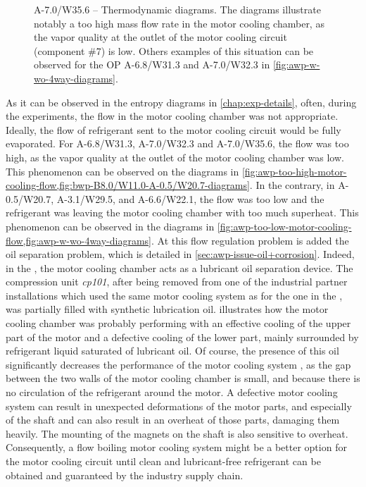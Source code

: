 \begin{figure}[htbp]
  \centering
  \hspace{1em}
  \caption[A-7.0/W35.6 -- Thermodynamic diagrams]{A-7.0/W35.6 --
    Thermodynamic diagrams. The diagrams illustrate notably a too high
    mass flow rate in the motor cooling chamber, as the vapor quality
    at the outlet of the motor cooling circuit (component \#7) is
    low. Others examples of this situation can be observed for the OP
    A-6.8/W31.3 and A-7.0/W32.3 in \cref{fig:awp-w-wo-4way-diagrams}.}
  \label{fig:awp-too-low-motor-cooling-flow}
\end{figure}

As it can be observed in the entropy diagrams in
\cref{chap:exp-details}, often, during the experiments, the flow in
the motor cooling chamber was not appropriate. Ideally, the flow of
refrigerant sent to the motor cooling circuit would be fully
evaporated. For \OP{} A-6.8/W31.3, A-7.0/W32.3 and A-7.0/W35.6, the
flow was too high, as the vapor quality at the outlet of the motor
cooling chamber was low. This phenomenon can be observed on the
diagrams in
\cref{fig:awp-too-high-motor-cooling-flow,fig:bwp-B8.0/W11.0-A-0.5/W20.7-diagrams}. In
the contrary, in \OP{} A-0.5/W20.7, A-3.1/W29.5, and A-6.6/W22.1, the
flow was too low and the refrigerant was leaving the motor cooling
chamber with too much superheat. This phenomenon can be observed in
the diagrams in
\cref{fig:awp-too-low-motor-cooling-flow,fig:awp-w-wo-4way-diagrams}. At
this flow regulation problem is added the oil separation problem,
which is detailed in \cref{sec:awp-issue-oil+corrosion}. Indeed, in
the \AWP{}, the motor cooling chamber acts as a lubricant oil
separation device. The compression unit \textit{cp101}, after being
removed from one of the industrial partner installations which used
the same motor cooling system as for the one in the \AWP{}, was
partially filled with synthetic lubrication
oil.  illustrates how the motor cooling
chamber was probably performing with an effective cooling of the upper
part of the motor and a defective cooling of the lower part, mainly
surrounded by refrigerant liquid saturated of lubricant oil. Of
course, the presence of this oil significantly decreases the
performance of the motor cooling system \citep{}, as the gap between
the two walls of the motor cooling chamber is small, and because there
is no circulation of the refrigerant around the motor. A defective
motor cooling system can result in unexpected deformations of the
motor parts, and especially of the shaft and can also result in an
overheat of those parts, damaging them heavily. The mounting of the
magnets on the shaft is also sensitive to overheat. Consequently, a
flow boiling motor cooling system might be a better option for the
motor cooling circuit until clean and lubricant-free refrigerant can
be obtained and guaranteed by the industry supply chain.

